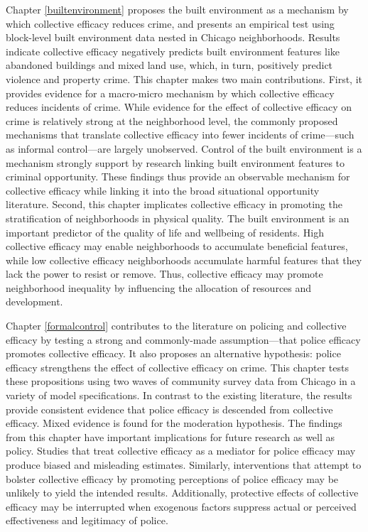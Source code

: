 \documentclass [11pt, proquest] {uwthesis}[2015/03/03]
\begin{document}
Chapter \ref{builtenvironment} proposes the built environment as a mechanism by which collective efficacy reduces crime, and presents an empirical test using block-level built environment data nested in Chicago neighborhoods. Results indicate collective efficacy negatively predicts built environment features like abandoned buildings and mixed land use, which, in turn, positively predict violence and property crime. This chapter makes two main contributions. First, it provides evidence for a macro-micro mechanism by which collective efficacy reduces incidents of crime. While evidence for the effect of collective efficacy on crime is relatively strong at the neighborhood level, the commonly proposed mechanisms that translate collective efficacy into fewer incidents of crime---such as informal control---are largely unobserved. Control of the built environment is a mechanism strongly support by research linking built environment features to criminal opportunity. These findings thus provide an observable mechanism for collective efficacy while linking it into the broad situational opportunity literature. Second, this chapter implicates collective efficacy in promoting the stratification of neighborhoods in physical quality. The built environment is an important predictor of the quality of life and wellbeing of residents. High collective efficacy may enable neighborhoods to accumulate beneficial features, while low collective efficacy neighborhoods accumulate harmful features that they lack the power to resist or remove. Thus, collective efficacy may promote neighborhood inequality by influencing the allocation of resources and development.

Chapter \ref{formalcontrol} contributes to the literature on policing and collective efficacy by testing a strong and commonly-made assumption---that police efficacy promotes collective efficacy. It also proposes an alternative hypothesis: police efficacy strengthens the effect of collective efficacy on crime. This chapter tests these propositions using two waves of community survey data from Chicago in a variety of model specifications. In contrast to the existing literature, the results provide consistent evidence that police efficacy is descended from collective efficacy. Mixed evidence is found for the moderation hypothesis. The findings from this chapter have important implications for future research as well as policy. Studies that treat collective efficacy as a mediator for police efficacy may produce biased and misleading estimates. Similarly, interventions that attempt to bolster collective efficacy by promoting perceptions of police efficacy may be unlikely to yield the intended results. Additionally, protective effects of collective efficacy may be interrupted when exogenous factors suppress actual or perceived effectiveness and legitimacy of police.
\end{document}
